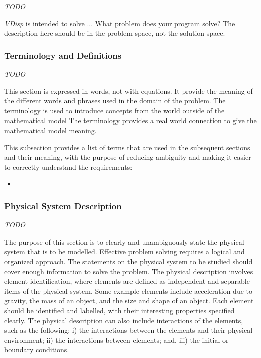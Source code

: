 \documentclass[12pt]{article}
\begin{document}
\emph{TODO}

\emph{VDisp} is intended to solve ... What problem does your program solve?
The description here should be in the problem space, not the solution space.

\subsubsection{Terminology and  Definitions}

\emph{TODO}

This section is expressed in words, not with equations.  It provide the meaning
of the different words and phrases used in the domain of the problem. The
terminology is used to introduce concepts from the world outside of the
mathematical model  The terminology provides a real world connection to give the
mathematical model meaning.

This subsection provides a list of terms that are used in the subsequent
sections and their meaning, with the purpose of reducing ambiguity and making it
easier to correctly understand the requirements:

\begin{itemize}

\item 

\end{itemize}

\subsubsection{Physical System Description} \label{sec_phySystDescrip}

\emph{TODO}

The purpose of this section is to clearly and unambiguously state the physical
system that is to be modelled. Effective problem solving requires a logical and
organized approach. The statements on the physical system to be studied should
cover enough information to solve the problem. The physical description involves
element identification, where elements are defined as independent and separable
items of the physical system. Some example elements include acceleration due to
gravity, the mass of an object, and the size and shape of an object. Each
element should be identified and labelled, with their interesting properties
specified clearly. The physical description can also include interactions of the
elements, such as the following: i) the interactions between the elements and
their physical environment; ii) the interactions between elements; and, iii) the
initial or boundary conditions.
\end{document}
